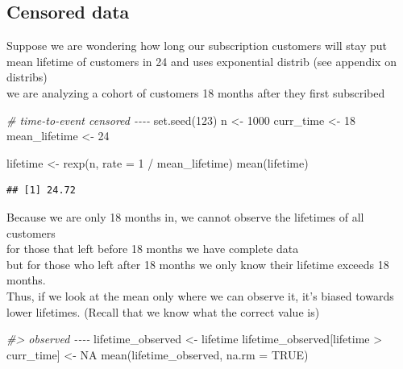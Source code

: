 \documentclass[
]{krantz}
\makeatletter
\newenvironment{Shaded}{\begin{snugshade}}{\end{snugshade}}
\newcommand{\AttributeTok}[1]{\textcolor[rgb]{0.61,0.61,0.61}{#1}}
\newcommand{\CommentTok}[1]{\textcolor[rgb]{0.37,0.37,0.37}{\textit{#1}}}
\newcommand{\ConstantTok}[1]{\textcolor[rgb]{0,0,0}{#1}}
\newcommand{\DecValTok}[1]{\textcolor[rgb]{0.06,0.06,0.06}{#1}}
\newcommand{\FunctionTok}[1]{\textcolor[rgb]{0,0,0}{#1}}
\newcommand{\NormalTok}[1]{#1}
\newcommand{\OtherTok}[1]{\textcolor[rgb]{0.37,0.37,0.37}{#1}}
\newcommand{\SpecialCharTok}[1]{\textcolor[rgb]{0,0,0}{#1}}
\newenvironment{kframe}{%
\medskip{}
\setlength{\fboxsep}{.8em}
 \def\at@end@of@kframe{}%
 \ifinner\ifhmode%
  \def\at@end@of@kframe{\end{minipage}}%
  \begin{minipage}{\columnwidth}%
 \fi\fi%
 \def\FrameCommand##1{\hskip\@totalleftmargin \hskip-\fboxsep
 \colorbox{shadecolor}{##1}\hskip-\fboxsep
     \hskip-\linewidth \hskip-\@totalleftmargin \hskip\columnwidth}%
 \MakeFramed {\advance\hsize-\width
   \@totalleftmargin\z@ \linewidth\hsize
   \@setminipage}}%
 {\par\unskip\endMakeFramed%
 \at@end@of@kframe}
\renewenvironment{Shaded}{\begin{kframe}}{\end{kframe}}
\makeatother
\begin{document}
\hypertarget{censored-data}{%
\subsection{Censored data}\label{censored-data}}

Suppose we are wondering how long our subscription customers will stay put\\
mean lifetime of customers in 24 and uses exponential distrib (see appendix on distribs)\\
we are analyzing a cohort of customers 18 months after they first subscribed

\begin{Shaded}
\begin{Highlighting}[]
\CommentTok{\# time{-}to{-}event censored {-}{-}{-}{-}}
\FunctionTok{set.seed}\NormalTok{(}\DecValTok{123}\NormalTok{)}
\NormalTok{n }\OtherTok{\textless{}{-}} \DecValTok{1000}
\NormalTok{curr\_time }\OtherTok{\textless{}{-}} \DecValTok{18}
\NormalTok{mean\_lifetime }\OtherTok{\textless{}{-}} \DecValTok{24}

\NormalTok{lifetime }\OtherTok{\textless{}{-}} \FunctionTok{rexp}\NormalTok{(n, }\AttributeTok{rate =} \DecValTok{1} \SpecialCharTok{/}\NormalTok{ mean\_lifetime)}
\FunctionTok{mean}\NormalTok{(lifetime)}
\end{Highlighting}
\end{Shaded}

\begin{verbatim}
## [1] 24.72
\end{verbatim}

Because we are only 18 months in, we cannot observe the lifetimes of all customers\\
for those that left before 18 months we have complete data\\
but for those who left after 18 months we only know their lifetime exceeds 18 months.\\
Thus, if we look at the mean only where we can observe it, it's biased towards lower lifetimes.
(Recall that we know what the correct value is)

\begin{Shaded}
\begin{Highlighting}[]
\CommentTok{\#\textgreater{} observed {-}{-}{-}{-}}
\NormalTok{lifetime\_observed }\OtherTok{\textless{}{-}}\NormalTok{ lifetime}
\NormalTok{lifetime\_observed[lifetime }\SpecialCharTok{\textgreater{}}\NormalTok{ curr\_time] }\OtherTok{\textless{}{-}} \ConstantTok{NA}
\FunctionTok{mean}\NormalTok{(lifetime\_observed, }\AttributeTok{na.rm =} \ConstantTok{TRUE}\NormalTok{)}
\end{Highlighting}
\end{Shaded}
\end{document}
